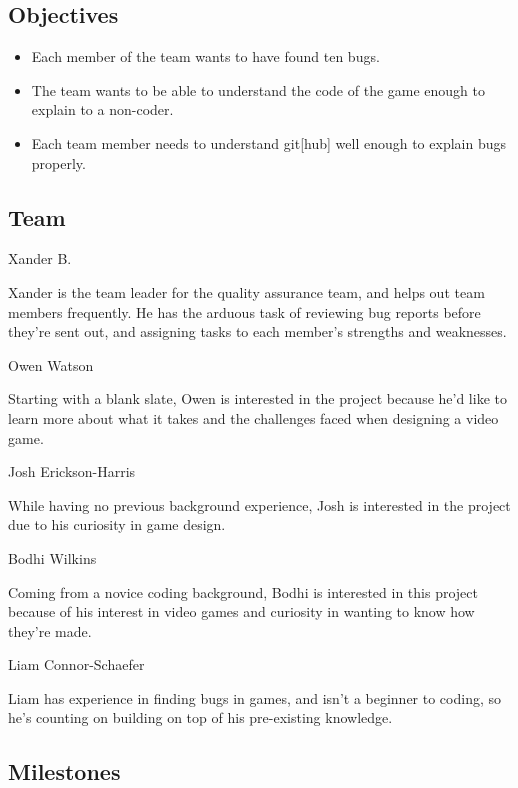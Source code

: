 \documentclass[11pt]{article}
\begin{document}
\subsection{{\color{blue}Objectives}}

\begin{itemize}
	\item Each member of the team wants to have found ten bugs.
	\item The team wants to be able to understand the code of the game enough to explain to a non-coder.
	\item Each team member needs to understand git[hub] well enough to explain bugs properly.
\end{itemize}

\subsection{{\color{blue}Team}}

{\large {\color{orange}Xander B.}}

Xander is the team leader for the quality assurance team, and helps out team members frequently. He has the arduous task of reviewing bug reports before they're sent out, and assigning tasks to each member's strengths and weaknesses.

{\large {\color{orange}Owen Watson}}

Starting with a blank slate, Owen is interested in the project because he'd like to learn more about what it takes and the challenges faced when designing a video game.


{\large {\color{orange}Josh Erickson-Harris}}

While having no previous background experience, Josh is interested in the project due to his curiosity in game design.

{\large {\color{orange}Bodhi Wilkins}}

Coming from a novice coding background, Bodhi is interested in this project because of his interest in video games and curiosity in wanting to know how they're made.

{\large {\color{orange}Liam Connor-Schaefer}}

Liam has experience in finding bugs in games, and isn't a beginner to coding, so he's counting on building on top of his pre-existing knowledge.

\subsection{{\color{blue}Milestones}}
\end{document}
